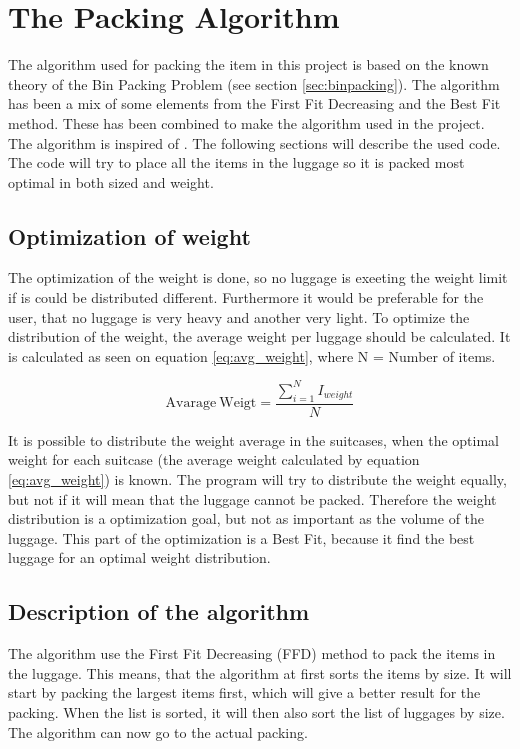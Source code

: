 \section{The Packing Algorithm}
\label{sec:algorithm}
The algorithm used for packing the item in this project is based on the known theory of the Bin Packing Problem (see section \ref{sec:binpacking}). The algorithm has been a mix of some elements from the First Fit Decreasing and the Best Fit method. These has been combined to make the algorithm used in the project. The algorithm is inspired of \citet{three-dim-pack}. The following sections will describe the used code.
The code will try to place all the items in the luggage so it is packed most optimal in both sized and weight.

\subsection{Optimization of weight}
The optimization of the weight is done, so no luggage is exeeting the weight limit if is could be distributed different. Furthermore it would be preferable for the user, that no luggage is very heavy and another very light.
To optimize the distribution of the weight, the average weight per luggage should be calculated. It is calculated as seen on equation \ref{eq:avg_weight}, where N = Number of items.

\begin{equation}
	\label{eq:avg_weight}
	\mathrm{Avarage~Weigt} = \frac{\displaystyle\sum_{i=1}^{N} I_{weight}}{N}
\end{equation}

It is possible to distribute the weight average in the suitcases, when the optimal weight for each suitcase (the average weight calculated by equation \ref{eq:avg_weight}) is known. The program will try to distribute the weight equally, but not if it will mean that the luggage cannot be packed. Therefore the weight distribution is a optimization goal, but not as important as the volume of the luggage. This part of the optimization is a Best Fit, because it find the best luggage for an optimal weight distribution.

\subsection{Description of the algorithm}
The algorithm use the First Fit Decreasing (FFD) method to pack the items in the luggage. This means, that the algorithm at first sorts the items by size. It will start by packing the largest items first, which will give a better result for the packing. When the list is sorted, it will then also sort the list of luggages by size. The algorithm can now go to the actual packing. 

